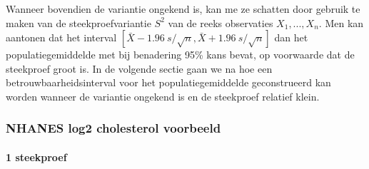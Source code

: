 \documentclass[
  12pt,dutch,coursenotes]{book}
\newenvironment{Shaded}{\begin{snugshade}}{\end{snugshade}}
\newcommand{\DataTypeTok}[1]{\textcolor[rgb]{0.13,0.29,0.53}{#1}}
\newcommand{\DecValTok}[1]{\textcolor[rgb]{0.00,0.00,0.81}{#1}}
\newcommand{\FloatTok}[1]{\textcolor[rgb]{0.00,0.00,0.81}{#1}}
\newcommand{\KeywordTok}[1]{\textcolor[rgb]{0.13,0.29,0.53}{\textbf{#1}}}
\newcommand{\NormalTok}[1]{#1}
\newcommand{\OperatorTok}[1]{\textcolor[rgb]{0.81,0.36,0.00}{\textbf{#1}}}
\newcommand{\StringTok}[1]{\textcolor[rgb]{0.31,0.60,0.02}{#1}}
\theoremstyle{definition}
\theoremstyle{definition}
\theoremstyle{definition}
\theoremstyle{remark}
\begin{document}
Wanneer bovendien de variantie ongekend is, kan me ze schatten door gebruik te maken van de
steekproefvariantie \(S^2\) van de reeks observaties \(X_1,...,X_n\). Men kan aantonen dat
het interval \([\bar{X} - 1.96 \ s/\sqrt{n} , \bar{X} + 1.96 \ s/\sqrt{n} ]\)
dan het populatiegemiddelde met bij benadering 95\% kans bevat, op voorwaarde
dat de steekproef groot is. In de volgende sectie gaan we na hoe een
betrouwbaarheidsinterval voor het populatiegemiddelde geconstrueerd kan
worden wanneer de variantie ongekend is en de steekproef relatief klein.

\hypertarget{nhanes-log2-cholesterol-voorbeeld}{%
\subsubsection{NHANES log2 cholesterol voorbeeld}\label{nhanes-log2-cholesterol-voorbeeld}}

\hypertarget{steekproef-1}{%
\paragraph{1 steekproef}\label{steekproef-1}}

\begin{Shaded}
\end{Shaded}
\end{document}
